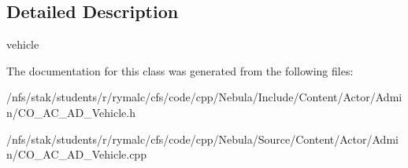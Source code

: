 \subsection{Detailed Description}
vehicle 

The documentation for this class was generated from the following files:\begin{DoxyCompactItemize}
\item 
/nfs/stak/students/r/rymalc/cfs/code/cpp/Nebula/Include/Content/Actor/Admin/CO\_\-AC\_\-AD\_\-Vehicle.h\item 
/nfs/stak/students/r/rymalc/cfs/code/cpp/Nebula/Source/Content/Actor/Admin/CO\_\-AC\_\-AD\_\-Vehicle.cpp\end{DoxyCompactItemize}
